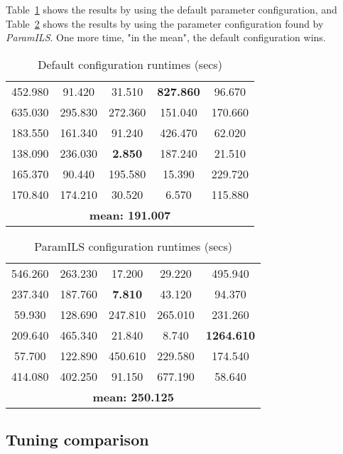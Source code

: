 Table~\ref{table:testcabad} shows the results by using the default parameter configuration, and Table~\ref{table:testcagood} shows the results by using the parameter configuration found by {\it ParamILS}. One more time, "in the mean", the default configuration wins.

\begin{table}[H]
\caption{Default configuration runtimes (secs)}
\centering
\renewcommand{\arraystretch}{1.2}
\begin{tabular}{|ccccc|}
	\hline
	452.980 & 91.420 & 31.510 & \textcolor{intenso}{\bf 827.860} & 96.670 \\ 
	635.030 & 295.830 & 272.360 & 151.040 & 170.660 \\  
	\hline 
	183.550 & 161.340 & 91.240 & 426.470 & 62.020 \\ 
	138.090 & 236.030 & \textcolor{naranja}{\bf 2.850} & 187.240 & 21.510 \\  
	\hline 
	165.370 & 90.440 & 195.580 & 15.390 & 229.720 \\ 
	170.840 & 174.210 & 30.520 & 6.570 & 115.880 \\  
	\hline
	\multicolumn{5}{|c|}{\bf mean: 191.007}\\
	\hline
\end{tabular}
\label{table:testcabad}
\end{table}

\begin{table}[H]
\caption{ParamILS configuration runtimes (secs)}
\centering
\renewcommand{\arraystretch}{1.2}
\begin{tabular}{|ccccc|}
	\hline
	546.260 & 263.230 & 17.200 & 29.220 & 495.940 \\ 
	237.340 & 187.760 & \textcolor{naranja}{\bf 7.810} & 43.120 & 94.370 \\  
	\hline 
	59.930 & 128.690 & 247.810 & 265.010 & 231.260 \\ 
	209.640 & 465.340 & 21.840 & 8.740 & \textcolor{intenso}{\bf 1264.610} \\  
	\hline 
	57.700 & 122.890 & 450.610 & 229.580 & 174.540 \\ 
	414.080 & 402.250 & 91.150 & 677.190 & 58.640 \\  
	\hline 
	\multicolumn{5}{|c|}{\bf mean: 250.125}\\
	\hline
\end{tabular}
\label{table:testcagood}
\end{table}    

\subsection{Tuning comparison}

